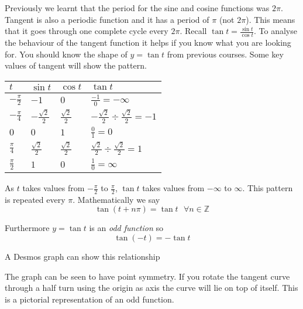 Previously we learnt that the period for the sine and cosine functions was $2 \pi $. Tangent is also a periodic function and it has a period of $\pi $ (not $2 \pi $). This means that it goes through one complete cycle every $2 \pi $. Recall $\tan  t =\frac{\sin  t}{\cos  t}$. To analyse the behaviour of the tangent function it helps if you know what you are looking for. You should know the shape of $y =\tan  t$ from previous courses. Some key values of tangent will show the pattern. 


\begin{tabular}[c]{|l|l|l|l|}\hline
	$t$  & $\sin  t$  & $\cos  t$  & $\tan  t$  \\
	\hline
	$ -\frac{\pi }{2}$  & $ -1$  & $0$  & $\frac{ -1}{0} = -\infty $  \\
	\hline
	$ -\frac{\pi }{4}$  & $ -\frac{\sqrt{2}}{2}$  & $\frac{\sqrt{2}}{2}$  & $ -\frac{\sqrt{2}}{2} \div \frac{\sqrt{2}}{2} = -1$  \\
	\hline
	$0$  & $0$  & $1$  & $\frac{0}{1} =0$  \\
	\hline
	$\frac{\pi }{4}$  & $\frac{\sqrt{2}}{2}$  & $\frac{\sqrt{2}}{2}$  & $\frac{\sqrt{2}}{2} \div \frac{\sqrt{2}}{2} =1$  \\
	\hline
	$\frac{\pi }{2}$  & $1$  & $0$  & $\frac{1}{0} =\infty $  \\
	\hline
\end{tabular}

As $t$ takes values from $ -\frac{\pi }{2}$ to $\frac{\pi }{2}$, $\tan  t$ takes values from $ -\infty $ to $\infty $. This pattern is repeated every $\pi $. Mathematically we say
\begin{equation*}\tan  \left (t +n \pi \right ) =\tan  t\text{\  } \forall n \in \mathbb{Z}
\end{equation*}

Furthermore $y =\tan  t$ is an \emph{odd function} so
\begin{equation*}\tan  \left ( -t\right ) = -\tan  t
\end{equation*}

A Desmos graph can show this relationship 

\setlength\fboxrule{0.01in}\setlength\fboxsep{0.2in}

The graph can be seen to have point symmetry. If you rotate the tangent curve through a half turn using the origin as axis the curve will lie on top of itself. This is a pictorial representation of an odd function.

